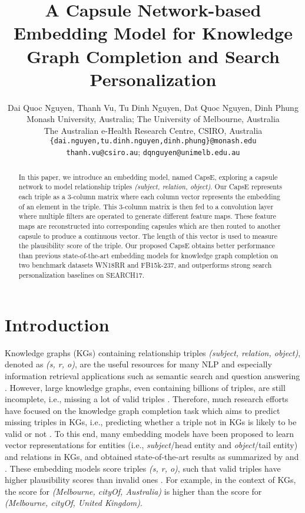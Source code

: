 \documentclass[11pt,a4paper]{article}
\title{A Capsule Network-based Embedding Model for Knowledge Graph Completion and Search Personalization}
\author{Dai Quoc Nguyen, Thanh Vu, Tu Dinh Nguyen, Dat Quoc Nguyen, Dinh Phung \\
Monash University, Australia; The University of Melbourne, Australia\\ The Australian e-Health Research Centre, CSIRO, Australia\\
{\tt{{\{dai.nguyen,tu.dinh.nguyen,dinh.phung\}@monash.edu}}} \\
{\tt{{thanh.vu@csiro.au}}}; {\tt{{dqnguyen@unimelb.edu.au}}}
}
\begin{document}
\maketitle

\begin{abstract}

In this paper, we introduce an embedding model, named CapsE, exploring a capsule network to model relationship triples \textit{(subject, relation, object)}. Our CapsE represents each triple as a 3-column matrix where each column vector represents the embedding of an element in the triple. This 3-column matrix is then fed to a convolution layer where multiple filters are operated to generate different feature maps. These feature maps are reconstructed into corresponding capsules which are then routed to another capsule to produce a continuous vector. The length of this vector is used to measure the plausibility score of the triple. Our proposed CapsE obtains better performance than previous state-of-the-art embedding models for knowledge graph completion on two benchmark datasets WN18RR and FB15k-237, and outperforms strong search personalization baselines on SEARCH17.



\end{abstract}

\section{Introduction}
Knowledge graphs (KGs) containing relationship triples \textit{(subject, relation, object)}, denoted as \textit{(s, r, o)}, are the useful resources for many NLP and especially information retrieval applications such as semantic  search and question answering \citep{8047276}. 
However, large knowledge graphs, even containing billions of triples, are still incomplete, i.e., missing a lot of valid triples \citep{West:2014}. 
Therefore, much research efforts have focused on the knowledge graph completion task which aims to predict missing triples in KGs, i.e., predicting whether a triple not in KGs is likely to be valid or not \citep{bordes2011learning,NIPS2013_5071,NIPS2013_5028}. 
To this end, many embedding models have been proposed to learn vector representations for entities (i.e., \textit{subject}/head entity and \textit{object}/tail entity) and relations in KGs, and obtained state-of-the-art results as summarized by \citet{NickelMTG15} and \citet{Nguyen2017}.
These embedding models score triples \textit{(s, r, o)}, such that valid triples have higher plausibility scores than invalid ones \citep{bordes2011learning,NIPS2013_5071,NIPS2013_5028}. 
For example, in the context of KGs, the score for \textit{(Melbourne, cityOf, Australia)} is higher than the score for \textit{(Melbourne, cityOf, United Kingdom)}.
 
\end{document}
